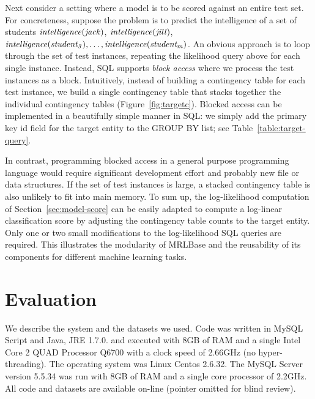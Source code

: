\documentclass{acm_proc_article-sp}
\begin{document}
%
Next consider a setting where a model is to be scored against an entire test set. 
For concreteness, suppose the problem is to predict the intelligence of a set of students
 $\it{intelligence}(jack)$, $\it{intelligence}(jill)$,
 $\it{intelligence}(student_{3}),\ldots, \it{intelligence}(student_{m})$.
 An obvious approach is to loop through the set of test instances, repeating the likelihood query above for each single instance. Instead, SQL supports {\em block access} where we process the test instances as a block. Intuitively, instead of building a contingency table for each test instance, we build a single contingency table that stacks together the individual contingency tables (Figure~\ref{fig:targetc}). Blocked access can be implemented in a beautifully simple manner in SQL: we simply add the primary key id field for the target entity to the GROUP BY list; see Table~\ref{table:target-query}. 
 
In contrast, programming blocked access in a general purpose programming language would require significant development effort and probably new file or data structures. If the set of test instances is large, a stacked contingency table is also unlikely to fit into main memory.
To sum up, the log-likelihood computation of Section~\ref{sec:model-score} can be easily adapted to compute a log-linear classification score by adjusting the contingency table counts to the target entity. Only one or two small modifications to the log-likelihood SQL queries are required. This illustrates the modularity of MRLBase and the reusability of its components for different machine learning tasks. 


\section{Evaluation} 
We describe the system and the datasets we used.
Code was written in MySQL Script and Java, JRE 1.7.0.  and executed with 8GB of RAM and a single Intel Core 2 QUAD Processor Q6700 with a clock speed of 2.66GHz (no hyper-threading). The operating system was Linux Centos 2.6.32. 
The MySQL Server version 5.5.34 was run with 8GB of RAM and a single core processor of 2.2GHz. 
All code and datasets are available on-line (pointer omitted for blind review). 
\end{document}
